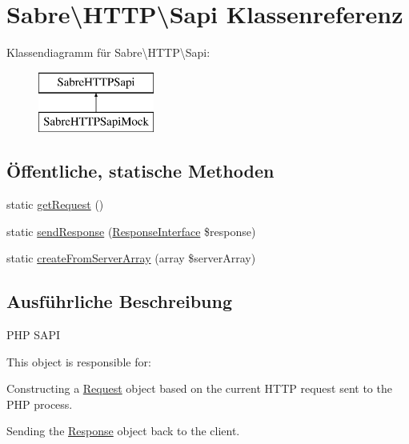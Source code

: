 \hypertarget{class_sabre_1_1_h_t_t_p_1_1_sapi}{}\section{Sabre\textbackslash{}H\+T\+TP\textbackslash{}Sapi Klassenreferenz}
\label{class_sabre_1_1_h_t_t_p_1_1_sapi}
Klassendiagramm für Sabre\textbackslash{}H\+T\+TP\textbackslash{}Sapi\+:\begin{figure}[H]
\begin{center}
\leavevmode
\includegraphics[height=2.000000cm]{class_sabre_1_1_h_t_t_p_1_1_sapi}
\end{center}
\end{figure}
\subsection*{Öffentliche, statische Methoden}
\begin{DoxyCompactItemize}
\item 
static \mbox{\hyperlink{class_sabre_1_1_h_t_t_p_1_1_sapi_a9a6f473099bc96ae72e657cb161ee6f1}{get\+Request}} ()
\item 
static \mbox{\hyperlink{class_sabre_1_1_h_t_t_p_1_1_sapi_a7cce278b850e1864015eb19ac77d6a49}{send\+Response}} (\mbox{\hyperlink{interface_sabre_1_1_h_t_t_p_1_1_response_interface}{Response\+Interface}} \$response)
\item 
static \mbox{\hyperlink{class_sabre_1_1_h_t_t_p_1_1_sapi_a02a4fbdd30798f033220b6f04095c331}{create\+From\+Server\+Array}} (array \$server\+Array)
\end{DoxyCompactItemize}


\subsection{Ausführliche Beschreibung}
P\+HP S\+A\+PI

This object is responsible for\+:
\begin{DoxyEnumerate}
\item Constructing a \mbox{\hyperlink{class_sabre_1_1_h_t_t_p_1_1_request}{Request}} object based on the current H\+T\+TP request sent to the P\+HP process.
\item Sending the \mbox{\hyperlink{class_sabre_1_1_h_t_t_p_1_1_response}{Response}} object back to the client.
\end{DoxyEnumerate}

